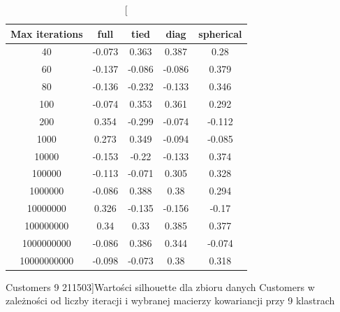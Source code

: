 \documentclass{classrep}
\begin{document}
{{\begin{table}[!htbp]
                \begin{minipage}{1\textwidth}
                \centering
                \begin{tabular}{|c|c|c|c|c|}
                \hline
                Max iterations & full & tied & diag & spherical \\ \hline
                40 & -0.073 & 0.363 & 0.387 & 0.28 \\ \hline
                60 & -0.137 & -0.086 & -0.086 & 0.379 \\ \hline
                80 & -0.136 & -0.232 & -0.133 & 0.346 \\ \hline
                100 & -0.074 & 0.353 & 0.361 & 0.292 \\ \hline
                200 & 0.354 & -0.299 & -0.074 & -0.112 \\ \hline
                1000 & 0.273 & 0.349 & -0.094 & -0.085 \\ \hline
                10000 & -0.153 & -0.22 & -0.133 & 0.374 \\ \hline
                100000 & -0.113 & -0.071 & 0.305 & 0.328 \\ \hline
                1000000 & -0.086 & 0.388 & 0.38 & 0.294 \\ \hline
                10000000 & 0.326 & -0.135 & -0.156 & -0.17 \\ \hline
                100000000 & 0.34 & 0.33 & 0.385 & 0.377 \\ \hline
                1000000000 & -0.086 & 0.386 & 0.344 & -0.074 \\ \hline
                10000000000 & -0.098 & -0.073 & 0.38 & 0.318 \\ \hline
                \end{tabular}
                \caption
                [Customers 9 211503]{Wartości silhouette dla zbioru danych Customers w zależności od liczby iteracji i wybranej macierzy kowariancji przy 9 klastrach}
                \label{Customers_9_211503}
                \end{minipage}
                \hfill
            
            \end{table}
            
}}
\end{document}
